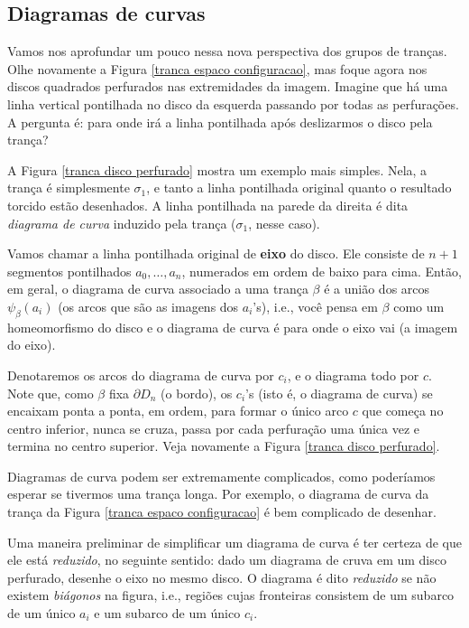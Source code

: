 	\subsection{Diagramas de curvas}
	\hspace{12pt} Vamos nos aprofundar um pouco nessa nova perspectiva dos grupos de tranças. Olhe novamente a Figura \eqref{tranca espaco configuracao}, mas foque agora nos discos quadrados perfurados nas extremidades da imagem. Imagine que há uma linha vertical pontilhada no disco da esquerda passando por todas as perfurações. A pergunta é: para onde irá a linha pontilhada após deslizarmos o disco pela trança?
	\par\vspace{0.3cm} A Figura \eqref{tranca disco perfurado} mostra um exemplo mais simples. Nela, a trança é simplesmente $\sigma_1$, e tanto a linha pontilhada original quanto o resultado torcido estão desenhados. A linha pontilhada na parede da direita é dita \textit{diagrama de curva} induzido pela trança ($\sigma_1$, nesse caso). 
	\par\vspace{0.3cm} Vamos chamar a linha pontilhada original de \textbf{eixo} do disco. Ele consiste de $n+1$ segmentos pontilhados $a_0, \dots, a_n$, numerados em ordem de baixo para cima. Então, em geral, o diagrama de curva associado a uma trança $\beta$ é a união dos arcos $\psi_{\beta}(a_i)$ (os arcos que são as imagens dos $a_i$'s), i.e., você pensa em $\beta$ como um homeomorfismo do disco e o diagrama de curva é para onde o eixo vai (a imagem do eixo). 
	\par\vspace{0.3cm} Denotaremos os arcos do diagrama de curva por $c_i$, e o diagrama todo por $c$. Note que, como $\beta$ fixa $\partial D_n$ (o bordo), os $c_i$'s (isto é, o diagrama de curva) se encaixam ponta a ponta, em ordem, para formar o único arco $c$ que começa no centro inferior, nunca se cruza, passa por cada perfuração uma única vez e termina no centro superior. Veja novamente a Figura \eqref{tranca disco perfurado}.  
	\par\vspace{0.3cm} Diagramas de curva podem ser extremamente complicados, como poderíamos esperar se tivermos uma trança longa. Por exemplo, o diagrama de curva da trança da Figura \eqref{tranca espaco configuracao} é bem complicado de desenhar. 
	\par\vspace{0.3cm} Uma maneira preliminar de simplificar um diagrama de curva é ter certeza de que ele está \textit{reduzido}, no seguinte sentido: dado um diagrama de cruva em um disco perfurado, desenhe o eixo no mesmo disco. O diagrama é dito \textit{reduzido} se não existem \textit{biágonos} na figura, i.e., regiões cujas fronteiras consistem de um subarco de um único $a_i$ e um subarco de um único $c_i$. 
